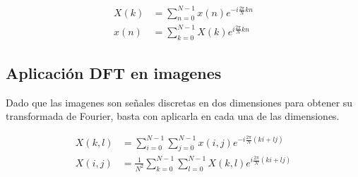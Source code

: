 \documentclass[
  letterpaper,
  twocolumn,
  9pt,
  journal,
  final]{IEEEtran}
\begin{document}
\begin{align}
	X(k) &= \sum_{n=0}^{N-1} x(n) e ^{-i \frac{2\pi}{N} k n } \label{eq:dft} \\
	x(n) &= \sum_{k=0}^{N-1} X(k) e ^{ i \frac{2\pi}{N} k n } \label{eq:dfti}
\end{align}

\subsection{Aplicación DFT en imagenes}

Dado que las imagenes son señales discretas en dos dimensiones para obtener su transformada de Fourier, basta con aplicarla en cada una de las dimensiones.

\begin{align}
	X(k,l) &= \sum_{i=0}^{N-1} \sum_{j=0}^{N-1} x(i,j) e ^ {-i \frac{2\pi}{N} (ki +lj)} \label{eq:dft2} \\
	X(i,j) &= \frac{1}{N^2} \sum_{k=0}^{N-1} \sum_{l=0}^{N-1} X(k,l) e ^ {i \frac{2\pi}{N} (ki +lj)} \label{eq:dft2}
\end{align}



\nocite{*}


\end{document}
